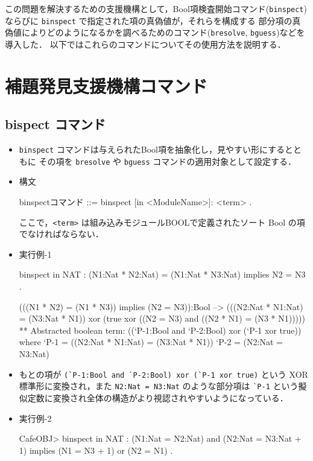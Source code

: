 \documentclass[a4paper,oneside,10pt,here]{memoir}
\newenvironment{vvtm}%
{\parskip=0pt\lineskip=0pt\begin{center}\begin{minipage}{0.8\textwidth}\begin{snugshade}}%
  {\end{snugshade}\end{minipage}\end{center}}
\begin{document}
この問題を解決するための支援機構として，Bool項検査開始コマンド(\verb|binspect|)
ならびに \verb|binspect| で指定された項の真偽値が，それらを構成する
部分項の真偽値によりどのようになるかを調べるためのコマンド(\verb|bresolve|, 
\verb|bguess|)などを導入した．
以下ではこれらのコマンドについてその使用方法を説明する．

\chapter{補題発見支援機構コマンド}
\section{bispect コマンド}
\begin{itemize}
\item \verb|binspect| コマンドは与えられたBool項を抽象化し，見やすい形にするとともに
  その項を \verb|bresolve| や \verb|bguess| コマンドの適用対象として設定する．
\item 構文
  \begin{vvtm}
    \begin{simplev}
    binspectコマンド ::= binspect [in <ModuleName>]: <term> .
    \end{simplev}
  \end{vvtm}
 ここで，\verb|<term>| は組み込みモジュールBOOLで定義されたソート Bool の項でなければならない．
\item 実行例-1
\begin{simplev}
binspect in NAT : (N1:Nat * N2:Nat) = (N1:Nat * N3:Nat) implies N2 = N3 .

(((N1 * N2) = (N1 * N3)) implies (N2 = N3)):Bool
--> (((N2:Nat * N1:Nat) = (N3:Nat * N1)) xor (true xor ((N2 = N3) and ((N2 * N1) = (N3 * N1)))))
** Abstracted boolean term:
  ((`P-1:Bool and `P-2:Bool) xor (`P-1 xor true))
  where
    `P-1 = ((N2:Nat * N1:Nat) = (N3:Nat * N1))
    `P-2 = (N2:Nat = N3:Nat)
\end{simplev}
\item もとの項が \verb|(`P-1:Bool and `P-2:Bool) xor (`P-1 xor true)| という
  XOR 標準形に変換され，また \verb|N2:Nat = N3:Nat| のような部分項は
  \verb|`P-1| という擬似定数に変換され全体の構造がより視認されやすいようになっている．
\item 実行例-2
\begin{simplev}
CafeOBJ> binspect in NAT : (N1:Nat = N2:Nat) and (N2:Nat = N3:Nat + 1) 
           implies (N1 = N3 + 1) or (N2 = N1) .


\end{simplev}
\end{itemize}
\end{document}
